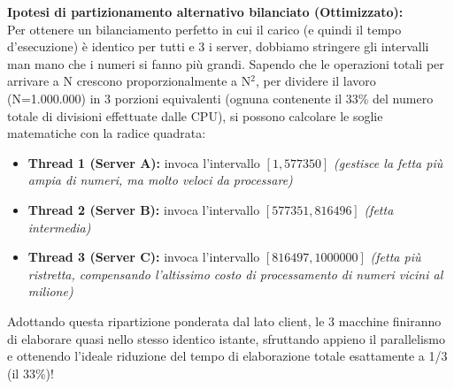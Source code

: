 \documentclass[11pt]{article}
\begin{document}
\begin{tcolorbox}[colback=green!5!white,colframe=green!75!black,title=\textbf{RISPOSTA}, breakable]
\begin{enumerate}
    \textbf{Ipotesi di partizionamento alternativo bilanciato (Ottimizzato):}\\
    Per ottenere un bilanciamento perfetto in cui il carico (e quindi il tempo d'esecuzione) è identico per tutti e 3 i server, dobbiamo stringere gli intervalli man mano che i numeri si fanno più grandi. Sapendo che le operazioni totali per arrivare a N crescono proporzionalmente a N$^2$, per dividere il lavoro (N=1.000.000) in 3 porzioni equivalenti (ognuna contenente il 33\% del numero totale di divisioni effettuate dalle CPU), si possono calcolare le soglie matematiche con la radice quadrata:
    \begin{itemize}
        \item \textbf{Thread 1 (Server A):} invoca l'intervallo $[1, 577350]$ \textit{(gestisce la fetta più ampia di numeri, ma molto veloci da processare)}
        \item \textbf{Thread 2 (Server B):} invoca l'intervallo $[577351, 816496]$ \textit{(fetta intermedia)}
        \item \textbf{Thread 3 (Server C):} invoca l'intervallo $[816497, 1000000]$ \textit{(fetta più ristretta, compensando l'altissimo costo di processamento di numeri vicini al milione)}
    \end{itemize}
    Adottando questa ripartizione ponderata dal lato client, le 3 macchine finiranno di elaborare quasi nello stesso identico istante, sfruttando appieno il parallelismo e ottenendo l'ideale riduzione del tempo di elaborazione totale esattamente a 1/3 (il 33\%)!
\end{enumerate}
\end{tcolorbox}
\end{document}
